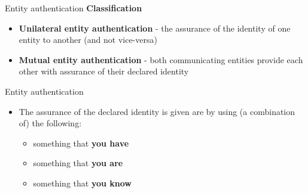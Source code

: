\documentclass[pdf]{beamer}
\begin{document}
\begin{frame}{Entity authentication}
\textbf{Classification}
\newline

\begin{itemize}
\item
\textbf{Unilateral entity authentication} - the assurance of the identity of one entity to another (and not vice-versa)
\newline

\item
\textbf{Mutual entity authentication} - both communicating entities provide each other with assurance of their declared identity
\end{itemize}
\end{frame}



\begin{frame}{Entity authentication}
\begin{itemize}
\item
The assurance of the declared identity is given are by using (a combination of) the following:
\newline

\begin{itemize}
\item
  something that \textbf{you have}
\item
  something that \textbf{you are}
\item
  something that \textbf{you know}
\end{itemize}
\end{itemize}
\end{frame}
\end{document}
